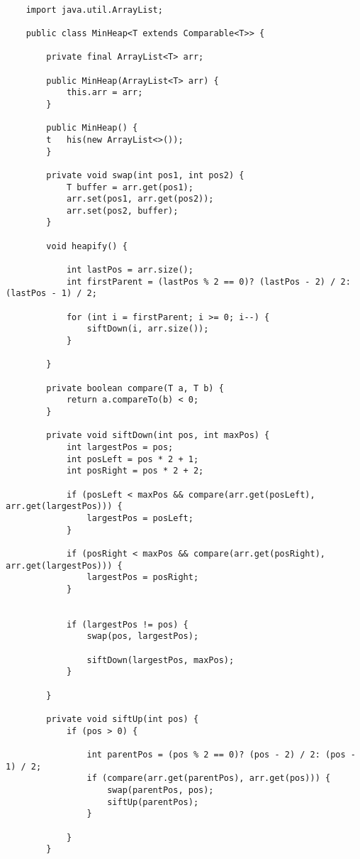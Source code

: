 \documentclass[paper=a4, fontsize=11pt]{scrartcl} %
\numberwithin{equation}{section} %
\numberwithin{figure}{section} %
\numberwithin{table}{section} %
\begin{document}
    \begin{lstlisting}

    import java.util.ArrayList;

    public class MinHeap<T extends Comparable<T>> {

        private final ArrayList<T> arr;

        public MinHeap(ArrayList<T> arr) {
            this.arr = arr;
        }

        public MinHeap() {
        t   his(new ArrayList<>());
        }

        private void swap(int pos1, int pos2) {
            T buffer = arr.get(pos1);
            arr.set(pos1, arr.get(pos2));
            arr.set(pos2, buffer);
        }

        void heapify() {

            int lastPos = arr.size();
            int firstParent = (lastPos % 2 == 0)? (lastPos - 2) / 2: (lastPos - 1) / 2;

            for (int i = firstParent; i >= 0; i--) {
                siftDown(i, arr.size());
            }

        }

        private boolean compare(T a, T b) {
            return a.compareTo(b) < 0;
        }

        private void siftDown(int pos, int maxPos) {
            int largestPos = pos;
            int posLeft = pos * 2 + 1;
            int posRight = pos * 2 + 2;

            if (posLeft < maxPos && compare(arr.get(posLeft), arr.get(largestPos))) {
                largestPos = posLeft;
            }

            if (posRight < maxPos && compare(arr.get(posRight), arr.get(largestPos))) {
                largestPos = posRight;
            }


            if (largestPos != pos) {
                swap(pos, largestPos);

                siftDown(largestPos, maxPos);
            }

        }

        private void siftUp(int pos) {
            if (pos > 0) {

                int parentPos = (pos % 2 == 0)? (pos - 2) / 2: (pos - 1) / 2;
                if (compare(arr.get(parentPos), arr.get(pos))) {
                    swap(parentPos, pos);
                    siftUp(parentPos);
                }

            }
        }


\end{lstlisting}
\end{document}
